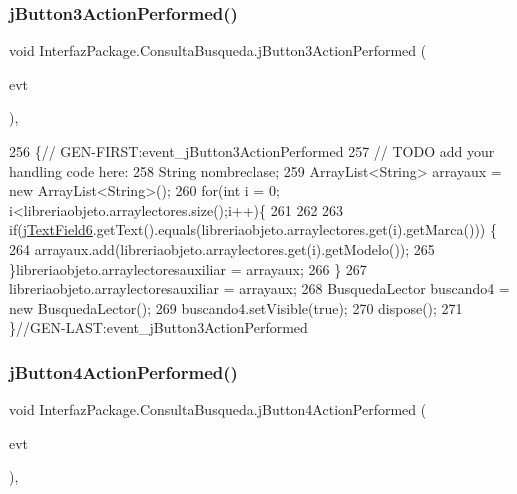 \subsubsection{\texorpdfstring{j\+Button3\+Action\+Performed()}{jButton3ActionPerformed()}}
{\footnotesize\ttfamily void Interfaz\+Package.\+Consulta\+Busqueda.\+j\+Button3\+Action\+Performed (\begin{DoxyParamCaption}\item[{java.\+awt.\+event.\+Action\+Event}]{evt }\end{DoxyParamCaption})\hspace{0.3cm}{\ttfamily [inline]}, {\ttfamily [private]}}


\begin{DoxyCode}
256                                                                          \{\textcolor{comment}{//
      GEN-FIRST:event\_jButton3ActionPerformed}
257         \textcolor{comment}{// TODO add your handling code here:}
258         String nombreclase;
259         ArrayList<String> arrayaux = \textcolor{keyword}{new} ArrayList<String>();
260         \textcolor{keywordflow}{for}(\textcolor{keywordtype}{int} i = 0; i<libreriaobjeto.arraylectores.size();i++)\{
261             
262                 
263                 \textcolor{keywordflow}{if}(\mbox{\hyperlink{class_interfaz_package_1_1_consulta_busqueda_a98f9196a81f18bfd45672e1c4605d68a}{jTextField6}}.getText().equals(libreriaobjeto.arraylectores.get(i).getMarca()))
      \{
264                 arrayaux.add(libreriaobjeto.arraylectores.get(i).getModelo());
265                 \}libreriaobjeto.arraylectoresauxiliar = arrayaux;
266         \}
267         libreriaobjeto.arraylectoresauxiliar = arrayaux;
268         BusquedaLector buscando4 = \textcolor{keyword}{new} BusquedaLector();
269         buscando4.setVisible(\textcolor{keyword}{true});
270         dispose();
271     \}\textcolor{comment}{//GEN-LAST:event\_jButton3ActionPerformed}
\end{DoxyCode}
\mbox{\label{class_interfaz_package_1_1_consulta_busqueda_ae40b8c7aa3f93785b928af92fe58d91f}} 
\subsubsection{\texorpdfstring{j\+Button4\+Action\+Performed()}{jButton4ActionPerformed()}}
{\footnotesize\ttfamily void Interfaz\+Package.\+Consulta\+Busqueda.\+j\+Button4\+Action\+Performed (\begin{DoxyParamCaption}\item[{java.\+awt.\+event.\+Action\+Event}]{evt }\end{DoxyParamCaption})\hspace{0.3cm}{\ttfamily [inline]}, {\ttfamily [private]}}


